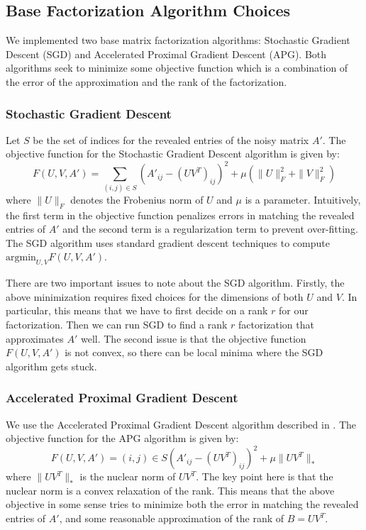 \subsection{Base Factorization Algorithm Choices}
We implemented two base matrix factorization algorithms: Stochastic Gradient Descent (SGD) and Accelerated Proximal Gradient Descent (APG). Both algorithms seek to minimize some objective function which is a combination of the error of the approximation and the rank of the factorization.
\subsubsection{Stochastic Gradient Descent}
Let $S$ be the set of indices for the revealed entries of the noisy matrix $A'$. The objective function for the Stochastic Gradient Descent algorithm is given by:
\[
F(U,V,A') = \sum_{(i,j)\in S} \left(A'_{ij} - (UV^T)_{ij}\right)^2 + \mu (\| U\|^2_F  + \| V\|^2_F)
\]
where $\|U\|_F$ denotes the Frobenius norm of $U$ and $\mu$ is a parameter. Intuitively, the first term in the objective function penalizes errors in matching the revealed entries of $A'$ and the second term is a regularization term to prevent over-fitting. The SGD algorithm uses standard gradient descent techniques to compute $\mbox{argmin}_{U,V} F(U,V,A')$. 

There are two important issues to note about the SGD algorithm. Firstly, the above minimization requires fixed choices for the dimensions of both $U$ and $V$. In particular, this means that we have to first decide on a rank $r$ for our factorization. Then we can run SGD to find a rank $r$ factorization that approximates $A'$ well. The second issue is that the objective function $F(U,V,A')$ is not convex, so there can be local minima where the SGD algorithm gets stuck.

\subsubsection{Accelerated Proximal Gradient Descent}
We use the Accelerated Proximal Gradient Descent algorithm described in \cite{APGPaper}. The objective function for the APG algorithm is given by:
\[
F(U,V,A') = {(i,j)\in S} \left(A'_{ij} - (UV^T)_{ij}\right)^2 + \mu \| UV^T\|_*
\]
where $\|UV^T\|_*$ is the nuclear norm of $UV^T$. The key point here is that the nuclear norm is a convex relaxation of the rank. This means that the above objective in some sense tries to minimize both the error in matching the revealed entries of $A'$, and some reasonable approximation of the rank of $B=UV^T$.


